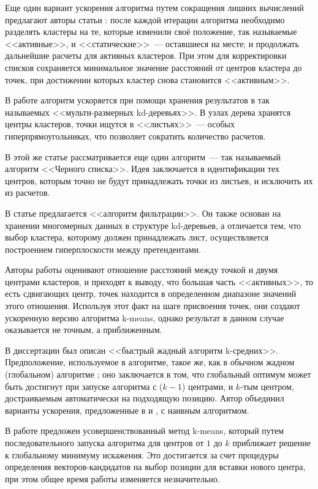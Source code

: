 Еще один вариант ускорения алгоритма путем сокращения лишних вычислений предлагают авторы статьи \cite{fastkm}: после каждой итерации алгоритма необходимо разделять кластеры на те, которые изменили своё положение, так называемые <<активные>>, и <<статические>>~--- оставшиеся на месте; и продолжать дальнейшие расчеты для активных кластеров. При этом для корректировки списков сохраняется минимальное значение расстояний от центров кластера до точек, при достижении которых кластер снова становится <<активным>>.

В работе \cite{mrkd} алгоритм ускоряется при помощи хранения результатов в так называемых <<мульти-размерных kd-деревьях>>. В узлах дерева хранятся центры кластеров, точки ищутся в <<листьях>>~--- особых гиперпрямоугольниках, что позволяет сократить количество расчетов.

В этой же статье рассматривается еще один алгоритм~--- так называемый алгоритм <<Черного списка>>. Идея заключается в идентификации тех центров, которым точно не будут принадлежать точки из листьев, и исключить их из расчетов.

В статье \cite{kanungo} предлагается <<алгоритм фильтрации>>. Он также основан на хранении многомерных данных в структуре kd-деревьев, а отличается тем, что выбор кластера, которому должен принадлежать лист, осуществляется построением гиперплоскости между претендентами.

Авторы работы \cite{approxkm} оценивают отношение расстояний между точкой и двумя центрами кластеров, и приходят к выводу, что большая часть <<активных>>, то есть сдвигающих центр, точек находится в определенном диапазоне значений этого отношения. Используя этот факт на шаге присвоения точек, они создают ускоренную версию алгоритма k-means, однако результат в данном случае оказывается не точным, а приближенным.

В диссертации \cite{hussein} был описан <<быстрый жадный алгоритм k-сред\-них>>. Предположение, используемое в алгоритме, такое же, как в обычном жадном (глобальном) алгоритме \cite{likas}; оно заключается в том, что глобальный оптимум может быть достигнут при запуске алгоритма с (\( k-1 \)) центрами, и \( k \)-тым центром, достраиваемым автоматически на подходящую позицию. Автор объединил варианты ускорения, предложенные в \cite{mrkd} и \cite{kanungo}, с наивным алгоритмом.

В работе \cite{hybrid} предложен усовершенствованный метод k-means, который путем последовательного запуска алгоритма для центров от \( 1 \) до \( k \) приближает решение к глобальному минимуму искажения. Это достигается за счет процедуры определения векторов-кандидатов на выбор позиции для вставки нового центра, при этом общее время работы изменяется незначительно.

